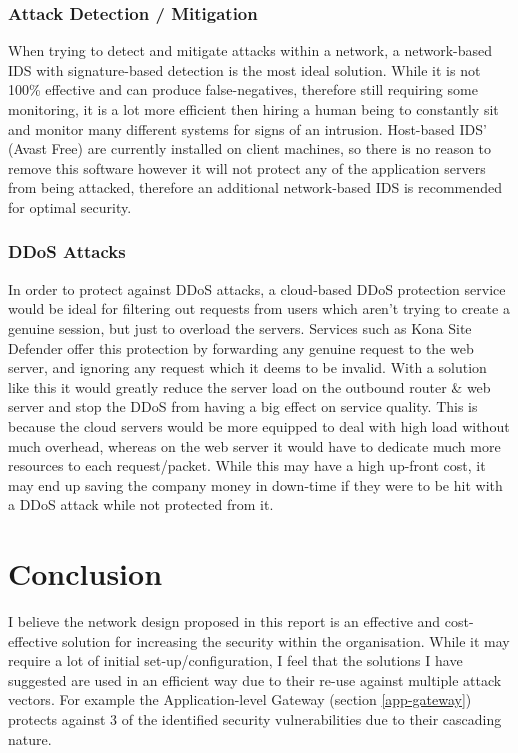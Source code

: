 \documentclass[11pt]{article}
\begin{document}
        \subsubsection{Attack Detection / Mitigation}
          When trying to detect and mitigate attacks within a network, a network-based IDS with signature-based detection is the most ideal solution. While it is not 100\% effective and can produce false-negatives, therefore still requiring some monitoring, it is a lot more efficient then hiring a human being to constantly sit and monitor many different systems for signs of an intrusion. Host-based IDS' (Avast Free) are currently installed on client machines, so there is no reason to remove this software however it will not protect any of the application servers from being attacked, therefore an additional network-based IDS is recommended for optimal security.

        \subsubsection{DDoS Attacks}
          In order to protect against DDoS attacks, a cloud-based DDoS protection service would be ideal for filtering out requests from users which aren't trying to create a genuine session, but just to overload the servers. Services such as Kona Site Defender \citep{akamai2018defender} offer this protection by forwarding any genuine request to the web server, and ignoring any request which it deems to be invalid. With a solution like this it would greatly reduce the server load on the outbound router \& web server and stop the DDoS from having a big effect on service quality. This is because the cloud servers would be more equipped to deal with high load without much overhead, whereas on the web server it would have to dedicate much more resources to each request/packet. While this may have a high up-front cost, it may end up saving the company money in down-time if they were to be hit with a DDoS attack while not protected from it.

    \section{Conclusion}
      I believe the network design proposed in this report is an effective and cost-effective solution for increasing the security within the organisation. While it may require a lot of initial set-up/configuration, I feel that the solutions I have suggested are used in an efficient way due to their re-use against multiple attack vectors. For example the Application-level Gateway (section \ref{app-gateway}) protects against 3 of the identified security vulnerabilities due to their cascading nature.\\
\end{document}
